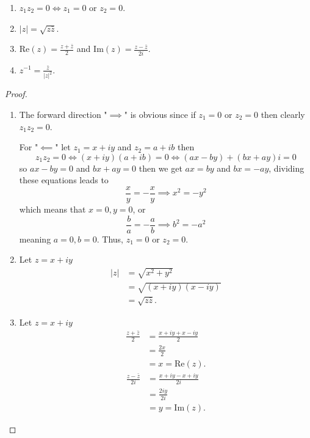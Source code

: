 \documentclass[10pt, a4paper]{article}
\begin{document}
\begin{lemma}\phantom{}
    \begin{enumerate}[label = \arabic*.]
        \item $z_1z_2 = 0 \iff z_1 = 0\text{ or } z_2 = 0$.

        \item $|z| = \sqrt{z\bar{z}}$.

        \item $\mathrm{Re}(z) = \frac{z + \bar{z}}{2}$ and $\mathrm{Im}(z) = \frac{z - \bar{z}}{2i}$.

        \item $z ^ {-1} = \frac{\bar{z}}{|z| ^ 2}$.
    \end{enumerate}

    \begin{proof}
        \begin{enumerate}[label = \arabic*.]
            \item
            The forward direction "$\implies$" is obvious since if $z_1 = 0$ or $z_2 = 0$ then clearly $z_1z_2 = 0$.

            For "$\impliedby$" let $z_1 = x + iy$ and $z_2 = a + ib$ then
            \[
            z_1z_2 = 0 \iff (x + iy)(a + ib) = 0 \iff (ax - by) + (bx + ay)i = 0
            \]
            so $ax - by = 0$ and $bx + ay = 0$ then we get $ax = by$ and $bx = -ay$,
            dividing these equations leads to
            \[
            \frac{x}{y} = -\frac{x}{y} \implies x ^ 2 = -y ^ 2
            \]
            which means that $x = 0, y = 0$,
            or
            \[
            \frac{b}{a} = -\frac{a}{b} \implies b ^ 2 = -a ^ 2
            \]
            meaning $a = 0, b = 0$.
            Thus,
            $z_1 = 0$ or $z_2 = 0$.

            \item
            Let $z = x + iy$
            \begin{align*}
                |z| &= \sqrt{x ^ 2 + y ^ 2} \\
                &= \sqrt{(x + iy)(x - iy)} \\
                &= \sqrt{z\bar{z}}.
            \end{align*}


            \item
            Let $z = x + iy$
            \begin{align*}
                \frac{z + \bar{z}}{2} &= \frac{x + iy + x - iy}{2} \\
                &= \frac{2x}{2} \\
                &= x = \mathrm{Re}(z).
            \end{align*}
            \begin{align*}
                \frac{z - \bar{z}}{2i} &= \frac{x + iy - x + iy}{2i} \\
                &= \frac{2iy}{2i} \\
                &= y = \mathrm{Im}(z).
            \end{align*}


\end{enumerate}
\end{proof}
\end{lemma}
\end{document}
